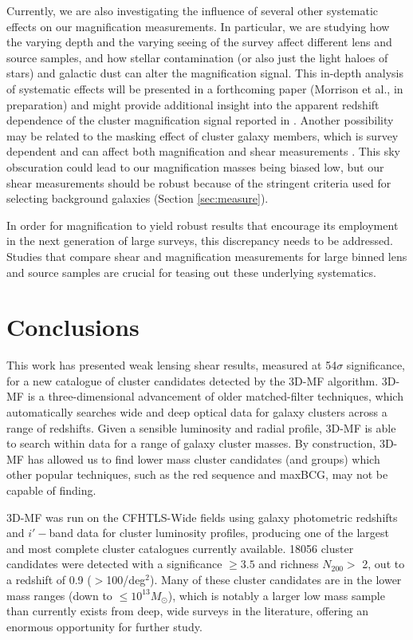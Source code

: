 Currently, we are also investigating the influence of several other systematic effects on our magnification measurements. In particular, we are studying how the varying depth and the varying seeing of the survey affect different lens and source samples, and how stellar contamination (or also just the light haloes of stars) and galactic dust can alter the magnification signal. This in-depth analysis of systematic effects will be presented in a forthcoming paper (Morrison et al., in preparation) and might provide additional insight into the apparent redshift dependence of the cluster magnification signal reported in \citet{Ford14}. Another possibility may be related to the masking effect of cluster galaxy members, which is survey dependent and can affect both magnification and shear measurements \citep{Simet14}. This sky obscuration could lead to our magnification masses being biased low, but our shear measurements should be robust because of the stringent criteria used for selecting background galaxies (Section \ref{sec:measure}).

In order for magnification to yield robust results that encourage its employment in the next generation of large surveys, this discrepancy needs to be addressed. Studies that compare shear and magnification measurements for large binned lens and source samples are crucial for teasing out these underlying systematics. 


\section{Conclusions}

This work has presented weak lensing shear results, measured at 54$\sigma$ significance, for a new catalogue of cluster candidates detected by the \ac{3D-MF} algorithm. \ac{3D-MF} is a three-dimensional advancement of older matched-filter techniques, which automatically searches wide and deep optical data for galaxy clusters across a range of redshifts. Given a sensible luminosity and radial profile, \ac{3D-MF} is able to search within data for a range of galaxy cluster masses. By construction, \ac{3D-MF} has allowed us to find lower mass cluster candidates (and groups) which other popular techniques, such as the red sequence and maxBCG, may not be capable of finding. 

\ac{3D-MF} was run on the \ac{CFHTLS}-Wide fields using galaxy photometric redshifts and $i'-$band data for cluster luminosity profiles, producing one of the largest and most complete cluster catalogues currently available. 18056 cluster candidates were detected with a significance $\ge 3.5$ and richness $N_{200} >$ 2, out to a redshift of 0.9 ($>$100/deg$^2$). Many of these cluster candidates are in the lower mass ranges (down to $\leq 10^{13} M_{\odot}$), which is notably a larger low mass sample than currently exists from deep, wide surveys in the literature, offering an enormous opportunity for further study. 

